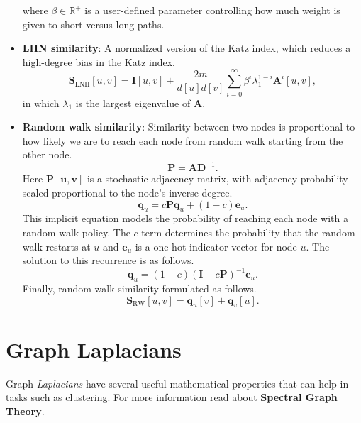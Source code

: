 \documentclass[twocolumn]{article}
\theoremstyle{plain}
\begin{document}
\begin{itemize}
        where $\beta \in \mathbb{R}^{+}$ is a user-defined parameter controlling how much weight is given to short versus long paths.
    \item \textbf{LHN similarity}: A normalized version of the Katz index, which reduces a high-degree bias in the Katz index.
        \begin{equation}
            \mathbf{S}_{\text{LNH}}[u,v] = \mathbf{I}[u,v] + \frac{2m}{d[u]d[v]} \sum_{i=0}^{\infty}\beta^i\lambda^{1-i}_1 \mathbf{A}^i[u,v],
        \end{equation}
        in which $\lambda_1$ is the largest eigenvalue of $\mathbf{A}$.
    \item \textbf{Random walk similarity}: Similarity between two nodes is proportional to how likely we are to reach each node from random walk starting from the other node.
        \begin{equation}
            \mathbf{P} = \mathbf{A}\mathbf{D}^{-1}.
        \end{equation}
        Here $\mathbf{P[u,v]}$ is a stochastic adjacency matrix, with adjacency probability scaled proportional to the node's inverse degree.
        \begin{equation}
            \mathbf{q}_u = c\mathbf{P}\mathbf{q}_u + (1-c)\mathbf{e}_u.
        \end{equation}
        This implicit equation models the probability of reaching each node with a random walk policy. The $c$ term determines the probability that the random walk restarts at $u$ and $\mathbf{e}_u$ is a one-hot indicator vector for node $u$. The solution to this recurrence is as follows.
        \begin{equation}
            \mathbf{q}_u = (1-c)(\mathbf{I}-c\mathbf{P})^{-1}\mathbf{e}_u.
        \end{equation}
        Finally, random walk similarity formulated as follows.
        \begin{equation}
            \mathbf{S}_{\text{RW}}[u,v] = \mathbf{q}_u[v] + \mathbf{q}_v[u].
        \end{equation}
\end{itemize}

\section{Graph Laplacians}

Graph \textit{Laplacians} have several useful mathematical properties that can help in tasks such as clustering. For more information read about \textbf{Spectral Graph Theory}.
\end{document}
